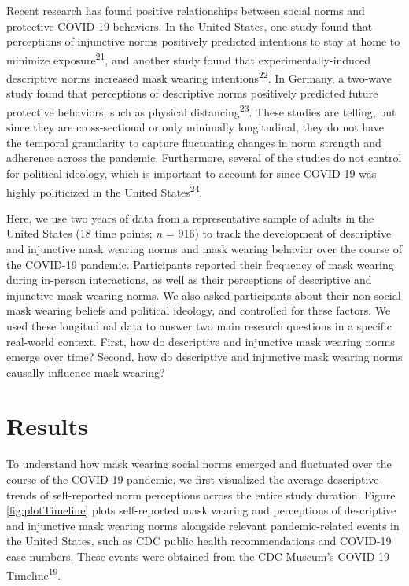 \documentclass[
  man, donotrepeattitle,floatsintext]{apa6}
\begin{document}
Recent research has found positive relationships between social norms and protective COVID-19 behaviors. In the United States, one study found that perceptions of injunctive norms positively predicted intentions to stay at home to minimize exposure\textsuperscript{21}, and another study found that experimentally-induced descriptive norms increased mask wearing intentions\textsuperscript{22}. In Germany, a two-wave study found that perceptions of descriptive norms positively predicted future protective behaviors, such as physical distancing\textsuperscript{23}. These studies are telling, but since they are cross-sectional or only minimally longitudinal, they do not have the temporal granularity to capture fluctuating changes in norm strength and adherence across the pandemic. Furthermore, several of the studies do not control for political ideology, which is important to account for since COVID-19 was highly politicized in the United States\textsuperscript{24}.

Here, we use two years of data from a representative sample of adults in the United States (18 time points; \emph{n} = 916) to track the development of descriptive and injunctive mask wearing norms and mask wearing behavior over the course of the COVID-19 pandemic. Participants reported their frequency of mask wearing during in-person interactions, as well as their perceptions of descriptive and injunctive mask wearing norms. We also asked participants about their non-social mask wearing beliefs and political ideology, and controlled for these factors. We used these longitudinal data to answer two main research questions in a specific real-world context. First, how do descriptive and injunctive mask wearing norms emerge over time? Second, how do descriptive and injunctive mask wearing norms causally influence mask wearing?

\hypertarget{results}{%
\section{Results}\label{results}}

To understand how mask wearing social norms emerged and fluctuated over the course of the COVID-19 pandemic, we first visualized the average descriptive trends of self-reported norm perceptions across the entire study duration. Figure \ref{fig:plotTimeline} plots self-reported mask wearing and perceptions of descriptive and injunctive mask wearing norms alongside relevant pandemic-related events in the United States, such as CDC public health recommendations and COVID-19 case numbers. These events were obtained from the CDC Museum's COVID-19 Timeline\textsuperscript{19}.
\end{document}
